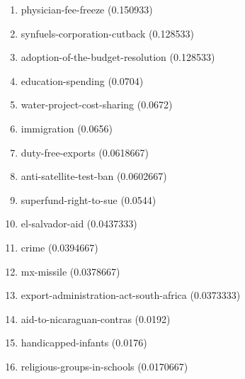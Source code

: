 \begin{enumerate}
\item physician-fee-freeze (0.150933)
\item synfuels-corporation-cutback (0.128533)
\item adoption-of-the-budget-resolution (0.128533)
\item education-spending (0.0704)
\item water-project-cost-sharing (0.0672)
\item immigration (0.0656)
\item duty-free-exports (0.0618667)
\item anti-satellite-test-ban (0.0602667)
\item superfund-right-to-sue (0.0544)
\item el-salvador-aid (0.0437333)
\item crime (0.0394667)
\item mx-missile (0.0378667)
\item export-administration-act-south-africa (0.0373333)
\item aid-to-nicaraguan-contras (0.0192)
\item handicapped-infants (0.0176)
\item religious-groups-in-schools (0.0170667)
\end{enumerate}